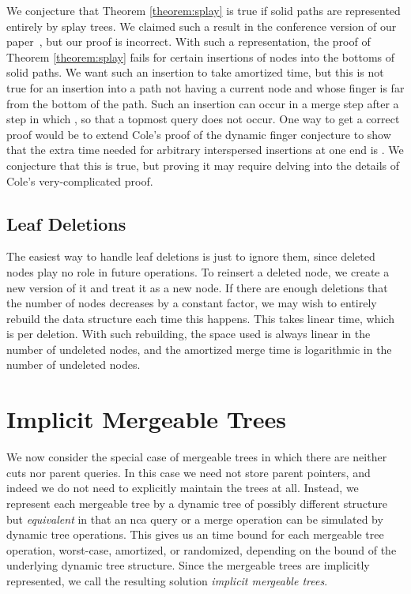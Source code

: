 \documentclass[twoside,leqno,twocolumn]{article}
\begin{document}
We conjecture that Theorem \ref{theorem:splay} is true if solid paths are represented entirely by splay trees.  We claimed such a result in the conference version of our paper~\cite{GTW06}, but our proof is incorrect.  With such a representation, the proof of Theorem \ref{theorem:splay} fails for certain insertions of nodes into the bottoms of solid paths.  We want such an insertion to take  amortized time, but this is not true for an insertion into a path not having a current node and whose finger is far from the bottom of the path.  Such an insertion can occur in a merge step after a step in which , so that a topmost query does not occur.  One way to get a correct proof would be to extend Cole's proof of the dynamic finger conjecture to show that the extra time needed for  arbitrary interspersed insertions at one end is .  We conjecture that this is true, but proving it may require delving into the details of Cole's very-complicated proof.


\subsection{Leaf Deletions}
\label{sec:deletions}

The easiest way to handle leaf deletions is just to ignore them, since deleted nodes play no role in future operations.  To reinsert a deleted node, we create a new version of it and treat it as a new node.  If there are enough deletions that the number of nodes decreases by a constant factor,  we may wish to entirely rebuild the data structure each time this happens.  This takes linear time, which is  per deletion.  With such rebuilding, the space used is always linear in the number of undeleted nodes, and the amortized merge time is logarithmic in the number of undeleted nodes.


\section{Implicit Mergeable Trees}
\label{sec:weak}

We now consider the special case of mergeable trees in which there are neither cuts nor parent queries.  In this case we need not store parent pointers, and indeed we do not need to explicitly maintain the trees at all.  Instead, we represent each mergeable tree by a dynamic tree of possibly different structure but \emph{equivalent} in that an nca query or a merge operation can be simulated by  dynamic tree operations.  This gives us an  time bound for each mergeable tree operation, worst-case, amortized, or randomized, depending on the bound of the underlying dynamic tree structure.  Since the mergeable trees are implicitly represented, we call the resulting solution \emph{implicit mergeable trees}.
\end{document}
